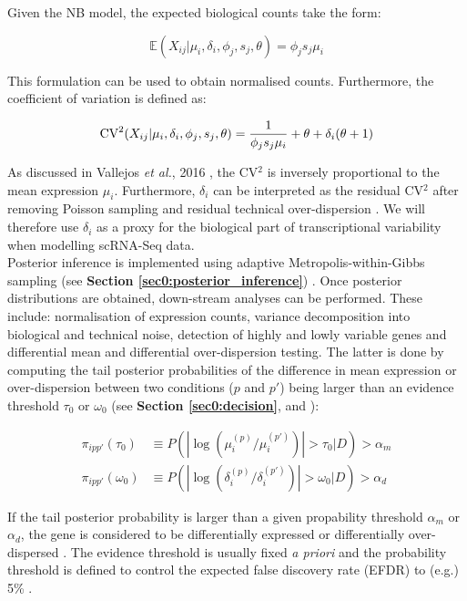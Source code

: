 \newpage

Given the NB model, the expected biological counts take the form:

\begin{equation}
\mathbb{E}(X_{ij}|\mu_i,\delta_i,\phi_j,s_j,\theta)=\phi_js_j\mu_i
\end{equation}

This formulation can be used to obtain normalised counts. Furthermore, the coefficient of variation is defined as:

\begin{equation}
\textnormal{CV}^2(X_{ij}|\mu_i,\delta_i,\phi_j,s_j,\theta)=\frac{1}{\phi_js_j\mu_i} + \theta + \delta_i(\theta + 1)
\end{equation}

As discussed in Vallejos \emph{et al.}, 2016 \citep{Vallejos2016}, the CV$^2$ is inversely proportional to the mean expression $\mu_i$. Furthermore, $\delta_i$ can be interpreted as the residual CV$^2$ after removing Poisson sampling and residual technical over-dispersion \citep{Vallejos2015BASiCS, Vallejos2016}. We will therefore use $\delta_i$ as a proxy for the biological part of transcriptional variability when modelling scRNA-Seq data.\\

Posterior inference is implemented using adaptive Metropolis-within-Gibbs sampling (see \textbf{Section \ref{sec0:posterior_inference}}) \citep{Vallejos2015BASiCS, Vallejos2016}. Once posterior distributions are obtained, down-stream analyses can be performed. These include: normalisation of expression counts, variance decomposition into biological and technical noise, detection of highly and lowly variable genes and differential mean and differential over-dispersion testing. The latter is done by computing the tail posterior probabilities of the difference in mean expression or over-dispersion between two conditions ($p$ and $p'$) being larger than an evidence threshold $\tau_0$ or $\omega_0$ (see \textbf{Section \ref{sec0:decision}}, and \citep{Bochkina2007, Vallejos2016}):

\begin{align*}
\pi_{ipp'}(\tau_0)&\equiv{}P(|\log(\mu_i^{(p)}/\mu_i^{(p')})|>\tau_0|D)>\alpha_m\\
\pi_{ipp'}(\omega_0)&\equiv{}P(|\log(\delta_i^{(p)}/\delta_i^{(p')})|>\omega_0|D)>\alpha_d
\end{align*}

If the tail posterior probability is larger than a given propability threshold $\alpha_m$ or $\alpha_d$, the gene is considered to be differentially expressed or differentially over-dispersed \citep{Vallejos2016}. The evidence threshold is usually fixed \emph{a priori} and the probability threshold is defined to control the expected false discovery rate (EFDR) to (e.g.) 5\% \cite{Newton2004, Vallejos2016}.\\

